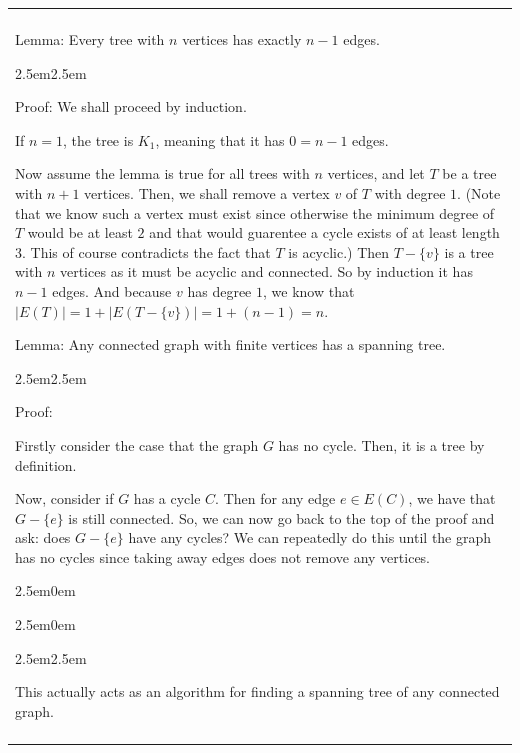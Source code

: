 \documentclass{book}
\newcommand{\hTwoOldd}{%
   \color{MidnightBlue}%
   \fontsize{13}{13}\selectfont%
}
\newcommand{\hThreeOld}{%
   \color{PineGreen}
   \fontsize{13}{13}\selectfont%
}
\newcommand{\teachCommentOldd}{
   \color{Orange}%
   \fontsize{12}{12}\selectfont%
}
\newenvironment{myIndent}{%
   \begin{adjustwidth}{2.5em}{0em}%
}{%
   \end{adjustwidth}%
}
\newenvironment{myConstrict}{%
   \begin{adjustwidth}{2.5em}{2.5em}%
}{%
   \end{adjustwidth}%
}
\newcommand{\uuline}[2][.]{%
{\vphantom{a}\color{#1}%
\rlap{\rule[-0.18em]{\widthof{#2}}{0.06em}}%
\rlap{\rule[-0.32em]{\widthof{#2}}{0.06em}}}%
#2}
\newenvironment{myClosureDeprecated}[2][.]{%
   \color{#1}%
   \begin{tabular}{|p{#2in}|} \hline \\%
}{%
   \\ \\ \hline \end{tabular}%
}
\newcommand{\retTwo}{\hfill\bigbreak}
\begin{document}
   \begin{center}
      \begin{myClosureDeprecated}{5.5}
         \uuline{Lemma}: Every tree with $n$ vertices has exactly
         $n - 1$ edges.
         \hThreeOld
         \begin{myConstrict}
            Proof: We shall proceed by induction. \retTwo
            
            If $n = 1$, the tree is $K_1$, meaning that it has $0=n-1$
            edges. \retTwo

            Now assume the lemma is true for all trees with $n$
            vertices, and let $T$ be a tree with $n+1$ vertices. Then,
            we shall remove a vertex $v$ of $T$ with degree $1$. 
            (Note that we know such a vertex must exist since 
            otherwise the minimum degree of $T$ would be 
            at least $2$ and that would guarentee a cycle exists 
            of at least length 3. This
            of course contradicts the fact that $T$ is acyclic.)
            \retTwo 
            Then $T - \{v\}$ is a tree with $n$ vertices as it must be acyclic and connected. 
            So by induction it has $n-1$ edges. And because
            $v$ has degree $1$, we know that \newline $\lvert E(T) \rvert
            = 1 + \lvert E(T - \{v\}) \rvert = 1 + (n - 1) = n$.
         \end{myConstrict} \retTwo
         \hTwoOldd

         \uuline{Lemma}: Any connected graph with finite vertices has a spanning tree.
         \hThreeOld
         \begin{myConstrict}
            Proof: \retTwo

            Firstly consider the case that the graph $G$ has no cycle.
            Then, it is a tree by definition. \retTwo

            Now, consider if $G$ has a cycle $C$. Then for any edge \newline
            $e \in E(C)$, we have that $G - \{e\}$ is still connected.
            So, we can now go back to the top of the proof and ask:
            does $G -\{e\}$ have any cycles? We can repeatedly do this
            until the graph has no cycles since taking away edges
            does not remove any vertices.
            
         \end{myConstrict}
         \teachCommentOldd
         \begin{myIndent}\begin{myIndent}
            \begin{myConstrict}
            This actually acts as an algorithm for finding a spanning
            tree of any connected graph.
            \end{myConstrict}
         \end{myIndent}\end{myIndent}
      \end{myClosureDeprecated}
   \end{center}\retTwo
\end{document}
